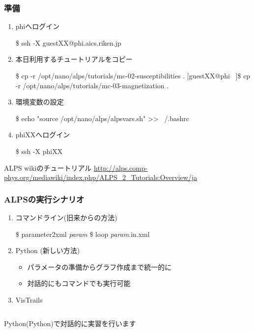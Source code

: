 \begin{frame}[fragile,shrink=10]
  \frametitle{準備}
  \begin{enumerate}
  \item<1-> phiへログイン
\begin{semiverbatim}
\$ ssh -X guestXX@phi.aics.riken.jp
\end{semiverbatim}
  \item<2-> 本日利用するチュートリアルをコピー
\begin{semiverbatim}
\$ cp -r /opt/nano/alps/tutorials/mc-02-susceptibilities .
[guestXX@phi ~]\$ cp -r /opt/nano/alps/tutorials/mc-03-magnetization .
\end{semiverbatim}
  \item<3-> 環境変数の設定
\begin{semiverbatim}
\$ echo "source /opt/nano/alps/alpsvars.sh" >> ~/.bashrc
\end{semiverbatim}
  \item<4-> phiXXへログイン
\begin{semiverbatim}
\$ ssh -X phiXX
\end{semiverbatim}
  \end{enumerate}
  \begin{alertblock}{ALPS wikiのチュートリアル}
    \url{http://alps.comp-phys.org/mediawiki/index.php/ALPS_2_Tutorials:Overview/ja}
  \end{alertblock}
\end{frame}

\begin{frame}[fragile]
  \frametitle{ALPSの実行シナリオ}
  \begin{enumerate}
  \item コマンドライン(旧来からの方法)
\begin{semiverbatim}
\$ parameter2xml \textit{param}
\$ loop \textit{param}.in.xml
\end{semiverbatim}
  \item \alert{Python} (新しい方法)
    \begin{itemize}
    \item パラメータの準備からグラフ作成まで統一的に
    \item 対話的にもコマンドでも実行可能
    \end{itemize}
  \item VisTrails
  \end{enumerate}
  \begin{columns}
    \begin{column}{.7\textwidth}
      \begin{center}
        \begin{alertblock}{}
          Python(Python)で対話的に実習を行います
        \end{alertblock}
      \end{center}
    \end{column}
  \end{columns}
\end{frame}

